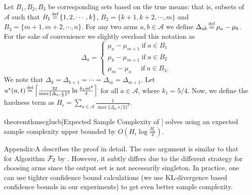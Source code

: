 Let $B_1, B_2, B_3$ be corresponding sets based on the true means: that is, subsets of $\mathcal{A}$ such that $B_1 \defeq \{1, 2,\cdots, k\}$,
$B_2 = \{k+1, k+2,\cdots, m\}$ and $B_3=\{m+1, m+2,\cdots, n\}$. For any two arms $a, b \in \mathcal{A}$ we define
$\Delta_{ab} \defeq \mu_a - \mu_b$. For the sake of convenience we slightly overload this notation as
{\footnotesize
\begin{equation}\label{eq:defdelta}
 \Delta_a = \begin{cases}
  \mu_a - \mu_{m+1}\; \text{if}\; a \in B_1\\
  \mu_k - \mu_{m+1}\; \text{if}\; a \in B_2\\
  \mu_m - \mu_a\;\;\;\;\; \text{if}\; a \in B_3.
 \end{cases}
\end{equation}
}
We note that $\Delta_k = \Delta_{k+1} = \cdots = \Delta_m = \Delta_{m+1}$.
Let $u^*(a,t) \defeq \bceil{\frac{32}{\max\{\Delta_a, \frac{\epsilon}{2}\}^2}\ln\frac{k_1 n t^4}{\delta}}$ for all $a \in \mathcal{A}$, where $k_1=5/4$. 
Now, we define the hardness term as $H_\epsilon = \sum_{a \in \mathcal{A}}\frac{1}{\max\{\Delta_a, \epsilon/2\}^2}$.

\begin{restatable}{theorem}{thmscglucb}[Expected Sample Complexity of \GLUCB]
\label{thm:scglucb}
\GLUCB solves \QFK using an expected sample complexity upper bounded by
$O\left(H_\epsilon \log\frac{H_\epsilon}{\delta}\right)$. 
\end{restatable}
Appendix-A describes the proof in detail. The core argument 
is similar to
that for Algorithm $\mathcal{F}_2$ by \citet{bib:arcsk2017}. However, it subtly differs due to the different strategy for choosing arms since the output set is
not necessarily singleton.
In practice, one can use
tighter confidence bound calculations (we use KL-divergence based
confidence bounds in our experiments) to get even better sample complexity.


